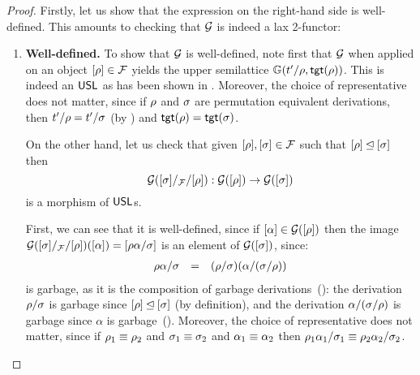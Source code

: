 \begin{proof}
Firstly, let us show that the expression on the right-hand side is well-defined.
This amounts to checking that $\mathcal{G}$ is indeed a lax 2-functor:
\begin{enumerate}
\item {\bf Well-defined.}
  To show that $\mathcal{G}$ is well-defined,
  note first that $\mathcal{G}$ when applied on an object ${[\rho]} \in \mathcal{F}$ yields the
  upper semilattice $\mathbb{G}(t'/\rho, \mathsf{tgt}(\rho))$.
  This is indeed an $\mathsf{USL}$ as has been shown in .
  Moreover, the choice of representative does not matter,
  since if $\rho$ and $\sigma$ are permutation equivalent derivations,
  then $t'/\rho = t'/\sigma$ (by )
  and $\mathsf{tgt}(\rho) = \mathsf{tgt}(\sigma)$.

  On the other hand, let us check that given ${[\rho]},{[\sigma]} \in \mathcal{F}$
  such that ${[\rho]} \unlhd {[\sigma]}$
  then
  \[
    \mathcal{G}({[\sigma]}/_{\mathcal{F}}/{[\rho]}) : \mathcal{G}({[\rho]}) \to \mathcal{G}({[\sigma]})
  \]
  is a morphism of $\mathsf{USL}$s.

  First, we can see that it is well-defined,
  since if ${[\alpha]} \in \mathcal{G}([\rho])$
  then the image $\mathcal{G}({[\sigma]}/_{\mathcal{F}}/{[\rho]})({[\alpha]}) = {[\rho\alpha/\sigma]}$
  is an element of $\mathcal{G}([\sigma])$,
  since:
  \[
    \begin{array}{rcll}
      \rho\alpha/\sigma & = & (\rho/\sigma)(\alpha/(\sigma/\rho)) \\
    \end{array}
  \]
    is garbage, as it is the composition of garbage derivations~():
  the derivation $\rho/\sigma$ is garbage since ${[\rho]} \unlhd {[\sigma]}$ (by definition),
  and the derivation $\alpha/(\sigma/\rho)$ is garbage since $\alpha$ is garbage~().
  Moreover, the choice of representative does not matter,
  since if $\rho_1 \equiv \rho_2$ and $\sigma_1 \equiv \sigma_2$ and $\alpha_1 \equiv \alpha_2$
  then $\rho_1\alpha_1/\sigma_1 \equiv \rho_2\alpha_2/\sigma_2$.


\end{enumerate}
\end{proof}
